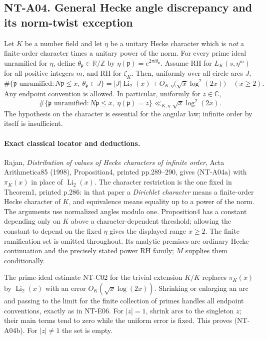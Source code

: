 \subsection*{NT-A04. General Hecke angle discrepancy and its norm-twist exception}
Let $K$ be a number field and let $\eta$ be a unitary Hecke character
which is \emph{not} a finite-order character times a unitary power
of the norm. For every prime ideal unramified for $\eta$, define
$\theta_{\mathfrak p}\in\mathbb R/\mathbb Z$ by
$\eta(\mathfrak p)=e^{2\pi i\theta_{\mathfrak p}}$.
Assume RH for $L_K(s,\eta^m)$ for all positive integers $m$, and RH
for $\zeta_K$. Then, uniformly over all circle arcs $J$,
\[
 \#\{\mathfrak p\text{ unramified}:N\mathfrak p\le x,\
                          \theta_{\mathfrak p}\in J\}
 =|J|\operatorname{Li}_2(x)
       +O_{K,\eta}\bigl(\sqrt x\log^2(2x)\bigr)
 \quad(x\ge2).                                         \tag{NT-A04a}
\]
Any endpoint convention is allowed. In particular, uniformly for
$z\in\mathbb C$,
\[
 \#\{\mathfrak p\text{ unramified}:N\mathfrak p\le x,\
                                  \eta(\mathfrak p)=z\}
       \ll_{K,\eta}\sqrt x\log^2(2x).                    \tag{NT-A04b}
\]
The hypothesis on the character is essential for the angular law;
infinite order by itself is insufficient.

\paragraph{Exact classical locator and deductions.}
Rajan, \emph{Distribution of values of Hecke characters of infinite
order}, Acta Arithmetica85 (1998), Proposition4, printed
pp.289--290, gives (NT-A04a) with $\pi_K(x)$ in place of
$\operatorname{Li}_2(x)$. The character restriction is the one fixed
in Theorem1, printed p.286: in that paper a \emph{Dirichlet character}
means a finite-order Hecke character of $K$, and equivalence means
equality up to a power of the norm. The arguments use normalized
angles modulo one. Proposition4 has a constant depending only on
$K$ above a character-dependent threshold; allowing the constant
to depend on the fixed $\eta$ gives the displayed range $x\ge2$.
The finite ramification set is omitted throughout. Its analytic
premises are ordinary Hecke continuation and the precisely stated
power RH family; $M$ supplies them conditionally.

The prime-ideal estimate NT-C02 for the trivial extension $K/K$
replaces $\pi_K(x)$ by $\operatorname{Li}_2(x)$ with an error
$O_K(\sqrt x\log(2x))$. Shrinking or enlarging an arc and passing
to the limit for the finite collection of primes handles all
endpoint conventions, exactly as in NT-E06. For $|z|=1$, shrink
arcs to the singleton $z$; their main terms tend to zero while the
uniform error is fixed. This proves (NT-A04b). For $|z|\ne1$ the
set is empty.


